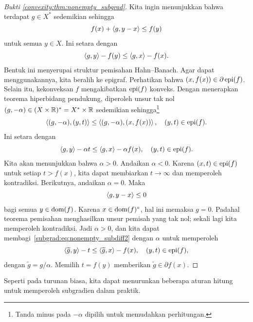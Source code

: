 \begin{proof}[Bukti \cref{convexity:thm:nonempty_subgrad}]
    Kita ingin menunjukkan bahwa terdapat $g\in X^*$ sedemikian sehingga
    \begin{equation}
        f(x)+\left\langle g , y-x\right\rangle\leq f(y)
    \end{equation}
    untuk semua $y\in X$. Ini setara dengan
    \begin{equation}\label{subgrad:eq:nonempty_subdiff1}
        \left\langle g , y\right\rangle - f(y)\leq \left\langle g , x\right\rangle - f(x).
    \end{equation}
    Bentuk ini menyerupai struktur pemisahan Hahn--Banach. Agar dapat menggunakannya, kita beralih ke epigraf. Perhatikan bahwa $(x,f(x))\in \partial \operatorname{\mathrm{epi}}(f)$. Selain itu, kekonveksan $f$ mengakibatkan $\operatorname{\mathrm{epi}}(f)$ konveks. Dengan menerapkan teorema hiperbidang pendukung, diperoleh unsur tak nol $(g,-\alpha)\in (X\times\mathbb{R})^* = X^*\times\mathbb{R}$ sedemikian sehingga\footnote{Tanda minus pada $-\alpha$ dipilih untuk memudahkan perhitungan.}
    \begin{equation}\label{subgrad:eq:nonempty_subdiff2}
        \left\langle(g,-\alpha) , (y,t)\right\rangle\leq \left\langle(g,-\alpha) , (x,f(x))\right\rangle,\quad (y,t)\in \operatorname{\mathrm{epi}}(f).
    \end{equation}
    Ini setara dengan
    \begin{equation}
        \left\langle g , y\right\rangle-\alpha t \leq \left\langle g , x\right\rangle - \alpha f(x),\quad (y,t)\in \operatorname{\mathrm{epi}}(f).
    \end{equation}
    Kita akan menunjukkan bahwa $\alpha>0$. Andaikan $\alpha<0$. Karena $(x,t)\in \operatorname{\mathrm{epi}}(f)$ untuk setiap $t>f(x)$, kita dapat membiarkan $t\rightarrow \infty$ dan memperoleh kontradiksi. Berikutnya, andaikan $\alpha=0$. Maka
    \begin{equation}
        \left\langle g , y-x\right\rangle \leq 0
    \end{equation}
    bagi semua $y\in\operatorname{\mathrm{dom}}(f)$. Karena $x\in \operatorname{\mathrm{dom}}(f)^\circ$, hal ini memaksa $g=0$. Padahal teorema pemisahan menghasilkan unsur pemisah yang tak nol; sekali lagi kita memperoleh kontradiksi. Jadi $\alpha>0$, dan kita dapat membagi~\eqref{subgrad:eq:nonempty_subdiff2} dengan $\alpha$ untuk memperoleh
    \begin{equation}
        \left\langle\widetilde{g} , y\right\rangle - t \leq \left\langle\widetilde{g} , x\right\rangle - f(x),\quad (y,t)\in \operatorname{\mathrm{epi}}(f),
    \end{equation}
    dengan $\widetilde{g} = g/\alpha$. Memilih $t=f(y)$ memberikan $\widetilde{g}\in\partial f(x)$.
\end{proof}

Seperti pada turunan biasa, kita dapat menurunkan beberapa aturan hitung untuk memperoleh subgradien dalam praktik.

